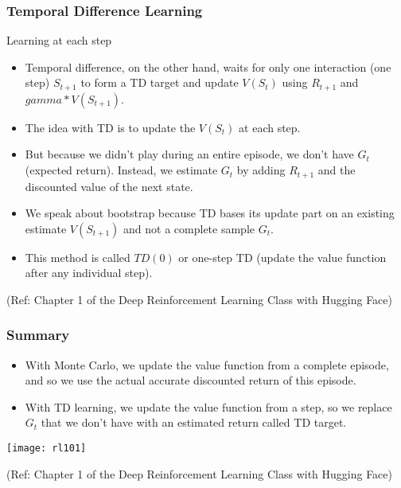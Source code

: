 \begin{frame}[fragile]\frametitle{Temporal Difference Learning}

Learning at each step

\begin{itemize}
\item Temporal difference, on the other hand, waits for only one interaction (one step) $S_{t+1}$ to form a TD target and update $V(S_t)$ using $R_{t+1}$ and $gamma * V(S_{t+1})$.
\item The idea with TD is to update the $V(S_t)$ at each step.
\item But because we didn't play during an entire episode, we don't have $G_t$ (expected return). Instead, we estimate $G_t$ by adding $R_{t+1}$ and the discounted value of the next state.
\item We speak about bootstrap because TD bases its update part on an existing estimate $V(S_{t+1})$ and not a complete sample $G_t$.
\item This method is called $TD(0)$ or one-step TD (update the value function after any individual step).

\end{itemize}


{\tiny (Ref: Chapter 1 of the Deep Reinforcement Learning Class with Hugging Face)}

\end{frame}

\begin{frame}[fragile]\frametitle{Summary}


\begin{itemize}
\item With Monte Carlo, we update the value function from a complete episode, and so we use the actual accurate discounted return of this episode.
\item With TD learning, we update the value function from a step, so we replace $G_t$ that we don't have with an estimated return called TD target.
\end{itemize}


\begin{center}
\texttt{[image: rl101]}
\end{center}



{\tiny (Ref: Chapter 1 of the Deep Reinforcement Learning Class with Hugging Face)}

\end{frame}


